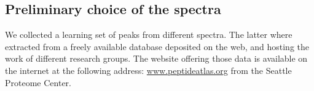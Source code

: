 \subsection{Preliminary choice of the spectra}

We collected a learning set of peaks from different spectra. 
The latter where extracted from a freely available database
deposited on the web, and hosting the work of different research groups.
The website offering those data is available on the internet at the following
address:
\href{http://www.peptideatlas.org/}{www.peptideatlas.org} from the Seattle Proteome
Center.

